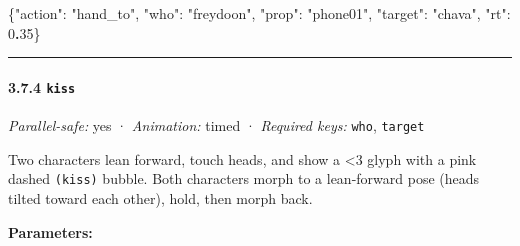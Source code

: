 \documentclass[
  11pt,
]{book}
\newenvironment{Shaded}{}{}
\newcommand{\DataTypeTok}[1]{\textcolor[rgb]{0.56,0.13,0.00}{#1}}
\newcommand{\DecValTok}[1]{\textcolor[rgb]{0.25,0.63,0.44}{#1}}
\newcommand{\ErrorTok}[1]{\textcolor[rgb]{1.00,0.00,0.00}{\textbf{#1}}}
\newcommand{\FunctionTok}[1]{\textcolor[rgb]{0.02,0.16,0.49}{#1}}
\newcommand{\StringTok}[1]{\textcolor[rgb]{0.25,0.44,0.63}{#1}}
\begin{document}
\begin{Shaded}
\begin{Highlighting}[]
\FunctionTok{\{}\DataTypeTok{"action"}\FunctionTok{:} \StringTok{"hand\_to"}\FunctionTok{,} \DataTypeTok{"who"}\FunctionTok{:} \StringTok{"freydoon"}\FunctionTok{,} \DataTypeTok{"prop"}\FunctionTok{:} \StringTok{"phone01"}\FunctionTok{,}
 \DataTypeTok{"target"}\FunctionTok{:} \StringTok{"chava"}\FunctionTok{,} \DataTypeTok{"rt"}\FunctionTok{:} \DecValTok{0}\ErrorTok{.}\DecValTok{35}\FunctionTok{\}}
\end{Highlighting}
\end{Shaded}

\begin{center}\rule{0.5\linewidth}{0.5pt}\end{center}

\paragraph{\texorpdfstring{3.7.4 \texttt{kiss}}{3.7.4 kiss}}\label{kiss}

\emph{Parallel-safe:} yes · \emph{Animation:} timed · \emph{Required
keys:} \texttt{who}, \texttt{target}

Two characters lean forward, touch heads, and show a \textless3 glyph
with a pink dashed \texttt{(kiss)} bubble. Both characters morph to a
lean-forward pose (heads tilted toward each other), hold, then morph
back.

\textbf{Parameters:}
\end{document}
